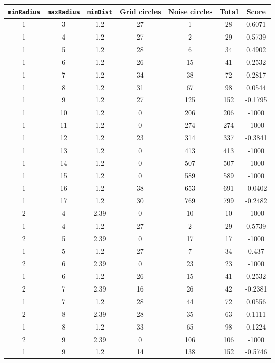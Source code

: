 \documentclass[letterpaper, 12pt]{article}
\begin{document}
\begin{longtable}{|c|c|c|c|c|c|c|}
\hline
\textbf{\texttt{minRadius}} & \textbf{\texttt{maxRadius}} & \textbf{\texttt{minDist}} & \textbf{Grid circles} & \textbf{Noise circles} & \textbf{Total} & \textbf{Score} \\
\hline
1 & 3 & 1.2 & 27 & 1 & 28 & 0.6071 \\
\hline
1 & 4 & 1.2 & 27 & 2 & 29 & 0.5739 \\
\hline
1 & 5 & 1.2 & 28 & 6 & 34 & 0.4902 \\
\hline
1 & 6 & 1.2 & 26 & 15 & 41 & 0.2532 \\
\hline
1 & 7 & 1.2 & 34 & 38 & 72 & 0.2817 \\
\hline
1 & 8 & 1.2 & 31 & 67 & 98 & 0.0544 \\
\hline
1 & 9 & 1.2 & 27 & 125 & 152 & -0.1795 \\
\hline
1 & 10 & 1.2 & 0 & 206 & 206 & -1000 \\
\hline
1 & 11 & 1.2 & 0 & 274 & 274 & -1000 \\
\hline
1 & 12 & 1.2 & 23 & 314 & 337 & -0.3841 \\
\hline
1 & 13 & 1.2 & 0 & 413 & 413 & -1000 \\
\hline
1 & 14 & 1.2 & 0 & 507 & 507 & -1000 \\
\hline
1 & 15 & 1.2 & 0 & 589 & 589 & -1000 \\
\hline
1 & 16 & 1.2 & 38 & 653 & 691 & -0.0402 \\
\hline
1 & 17 & 1.2 & 30 & 769 & 799 & -0.2482 \\
\hline
2 & 4 & 2.39 & 0 & 10 & 10 & -1000 \\
\hline
1 & 4 & 1.2 & 27 & 2 & 29 & 0.5739 \\
\hline
2 & 5 & 2.39 & 0 & 17 & 17 & -1000 \\
\hline
1 & 5 & 1.2 & 27 & 7 & 34 & 0.437 \\
\hline
2 & 6 & 2.39 & 0 & 23 & 23 & -1000 \\
\hline
1 & 6 & 1.2 & 26 & 15 & 41 & 0.2532 \\
\hline
2 & 7 & 2.39 & 16 & 26 & 42 & -0.2381 \\
\hline
1 & 7 & 1.2 & 28 & 44 & 72 & 0.0556 \\
\hline
2 & 8 & 2.39 & 28 & 35 & 63 & 0.1111 \\
\hline
1 & 8 & 1.2 & 33 & 65 & 98 & 0.1224 \\
\hline
2 & 9 & 2.39 & 0 & 106 & 106 & -1000 \\
\hline
1 & 9 & 1.2 & 14 & 138 & 152 & -0.5746 \\

\end{longtable}
\end{document}
